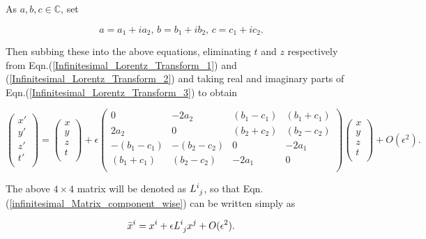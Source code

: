 \noindent As $a,b,c \in \mathbb{C}$, set 

\begin{equation*}
a = a_1 +ia_2 \text{,  } b = b_1 +ib_2 \text{,  } c = c_1 +ic_2 \text{.} 
\end{equation*}

\noindent Then subbing these into the above equations, eliminating $t$ and $z$ respectively from Eqn.(\ref{Infinitesimal_Lorentz_Transform_1}) and (\ref{Infinitesimal_Lorentz_Transform_2}) and taking real and imaginary parts of Eqn.(\ref{Infinitesimal_Lorentz_Transform_3}) to obtain

\begin{equation}\label{infinitesimal_Matrix_component_wise}
\left(
\begin{array}{c}
x' \\
y'\\
z'\\
t'\\
\end{array}
\right)
=
\left(
\begin{array}{c}
x \\
y\\
z\\
t\\
\end{array}
\right)
+ \epsilon
\left(
\begin{array}{cccc}
0            & -2a_2        & (b_1 - c_1) & (b_1+c_1)\\
2a_2         & 0            & (b_2+c_2)   & (b_2 - c_2) \\
-(b_1 - c_1) & -(b_2 - c_2) & 0           & -2a_1 \\
(b_1 + c_1)  & (b_2-c_2)    & -2a_1       & 0 \\
\end{array}
\right)
\left(
\begin{array}{c}
x \\
y\\
z\\
t\\
\end{array}
\right)
+ O(\epsilon^2).
\end{equation}

\noindent The above $4 \times 4$ matrix will be denoted as $\tensor{L}{^i_j}$, so that Eqn.(\ref{infinitesimal_Matrix_component_wise}) can be written simply as 

\begin{equation}\label{Infinitesimal_Infinitesimal_Lorentz_Transformation}
\bar{x}^i = x^i + \epsilon \tensor{L}{^{i}_{j}} x^j + O(\epsilon^2).
\end{equation}

